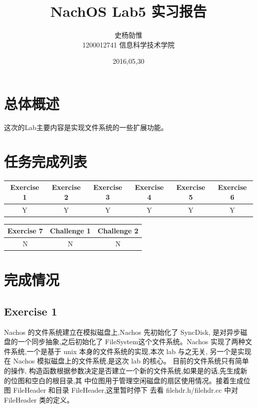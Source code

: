 \documentclass[nofonts]{ctexart}
\begin{document}
\title{%
\vspace{-30mm}\Huge NachOS Lab5 实习报告 \vspace{10mm}}
\author{%
\Large 史杨勍惟 
\\[10mm] 1200012741 信息科学技术学院}
\date{2016,05,30}

\maketitle

\newpage
\tableofcontents
\newpage

\section{总体概述}
这次的Lab主要内容是实现文件系统的一些扩展功能。

\section{任务完成列表}
\begin{table}[h]
\footnotesize
\begin{tabular}{|c|c|c|c|c|c|}\hline
\textbf{Exercise 1} & \textbf{Exercise 2} &
\textbf{Exercise 3} & \textbf{Exercise 4} &
\textbf{Exercise 5} & \textbf{Exercise 6}\\\hline
Y & Y & Y & Y & Y & Y\\\hline

\end{tabular}
\begin{tabular}{|c|c|c|}\hline
\textbf{Exercise 7} & \textbf{Challenge 1} & \textbf{Challenge 2}\\\hline
N & N & N\\\hline

\end{tabular}


\end{table}
\section{完成情况}
\subsection*{Exercise 1}
Nachos 的文件系统建立在模拟磁盘上,Nachos 先初始化了 SyncDisk,
是对异步磁盘的一个同步抽象,之后初始化了 FileSystem这个文件系统。Nachos 实现了两种文件系统,一个是基于 unix 本身的文件系统的实现,本次 lab 与之无关, 另一个是实现在 Nachos 模拟磁盘上的文件系统,是这次 lab 的核心。
目前的文件系统只有简单的操作,
构造函数根据参数决定是否建立一个新的文件系统,如果是的话,先生成新的位图和空白的根目录,其
中位图用于管理空闲磁盘的扇区使用情况。接着生成位图 FileHeader 和目录 FileHeader,这里暂时停下
去看 filehdr.h/filehdr.cc 中对 FileHeader 类的定义。
\end{document}
